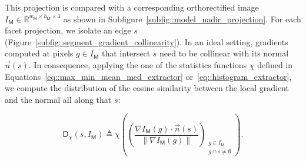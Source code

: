         This projection is compared with a corresponding orthorectified image \(I_{\mathsf{M}} \in \mathbb{R}^{w_{\mathsf{M}} \times h_{\mathsf{M}} \times 3}\) as shown in Subfigure~\ref{subfig::model_nadir_projection}.
        For each facet projection, we isolate an edge \(s\) (Figure~\ref{subfig::segment_gradient_collinearity}).
        In an ideal setting, gradients computed at pixels $g \in I_{\mathsf{M}}$ that intersect $s$ need to be collinear with its normal $\vec{n}(s)$.
        In consequence, applying the one of the statistics functions $\chi$ defined in Equations~\ref{eq::max_min_mean_med_extractor} or~\ref{eq::histogram_extractor}, we compute the distribution of the cosine similarity between the local gradient and the normal all along that $s$:
        
        \begin{equation}
            \label{eq::corr_seg}
            \mathsf{D}_{\chi}(s, I_{\mathsf{M}}) \triangleq \chi \left( \left(\frac{\nabla I_{\mathsf{M}}\left(g\right) \cdot \vec{n}(s)}{\left\rVert \nabla I_{\mathsf{M}}\left(g\right)\right\rVert}\right)_{\substack{g \in I_{\mathsf{M}} \\ g \cap s \neq \emptyset}} \right).
        \end{equation}

